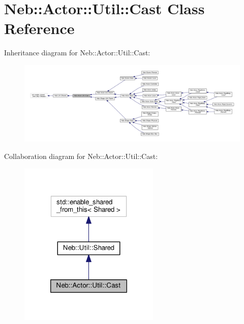 \hypertarget{classNeb_1_1Actor_1_1Util_1_1Cast}{\section{Neb\-:\-:Actor\-:\-:Util\-:\-:Cast Class Reference}
\label{classNeb_1_1Actor_1_1Util_1_1Cast}
}


Inheritance diagram for Neb\-:\-:Actor\-:\-:Util\-:\-:Cast\-:
\nopagebreak
\begin{figure}[H]
\begin{center}
\leavevmode
\includegraphics[width=350pt]{classNeb_1_1Actor_1_1Util_1_1Cast__inherit__graph}
\end{center}
\end{figure}


Collaboration diagram for Neb\-:\-:Actor\-:\-:Util\-:\-:Cast\-:
\nopagebreak
\begin{figure}[H]
\begin{center}
\leavevmode
\includegraphics[width=190pt]{classNeb_1_1Actor_1_1Util_1_1Cast__coll__graph}
\end{center}
\end{figure}
